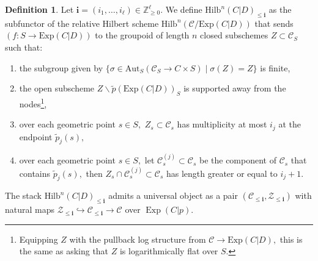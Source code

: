 \documentclass[10.5pt]{amsart}
\theoremstyle{definition}
\theoremstyle{definition}
\theoremstyle{definition}
\theoremstyle{definition}
\newtheorem{definition}[theorem]{Definition}
\newcommand{\Exp}{\operatorname{Exp}}
\newcommand{\Hilb}{\mathrm{Hilb}}
\newcommand{\bi}{\boldsymbol{i}}
\begin{document}
\begin{definition}
    Let $\bi=(i_1,\dots, i_\ell) \in \mathbb{Z}_{\geq 0}^\ell.$ We define $\Hilb^n(C|D)_{\le \bi}$ as the subfunctor of the relative Hilbert scheme $\Hilb^n(\mathscr{C}/\mathrm{Exp}(C|D))$ that sends $(f: S\to \mathrm{Exp}(C|D))$ to the groupoid of length $n$ closed subschemes $Z\subset \mathscr{C}_S$ such that: \begin{enumerate}
        \item the subgroup given by $\{\sigma\in \mathrm{Aut}_S(\mathscr{C}_S\to C\times S)\mid \sigma(Z) = Z\}$ is finite,
        \item the open subscheme $Z\smallsetminus \tilde{p}(\mathrm{Exp}(C|D))_S$ is supported away from the nodes\footnote{Equipping $Z$ with the pullback log structure from $\mathscr{C}\to \mathrm{Exp}(C|D),$ this is the same as asking that $Z$ is logarithmically flat over $S.$},
        \item over each geometric point $s\in S,$ $Z_s\subset \mathscr{C}_s$ has multiplicity at most $i_j$ at the endpoint $\tilde{p}_j(s),$
        \item over each geometric point $s\in S,$ let $\mathscr{C}^{(j)}_s\subset \mathscr{C}_s$ be the component of $\mathscr{C}_s$ that contains $\tilde{p}_j(s),$ then $Z_s\cap \mathscr{C}^{(j)}_s\subset \mathscr{C}_s$ has length greater or equal to $i_j+1.$
    \end{enumerate}
The stack $\Hilb^n(C|D)_{\leq \bi}$ admits a universal object as a pair $(\mathscr{C}_{\le \bi}, \mathscr{Z}_{\le \bi})$ with natural maps $\mathscr{Z}_{\le \bi}\hookrightarrow \mathscr{C}_{\le \bi}\to \mathscr{C}$ over $\Exp(C|p).$
\end{definition}
\end{document}
